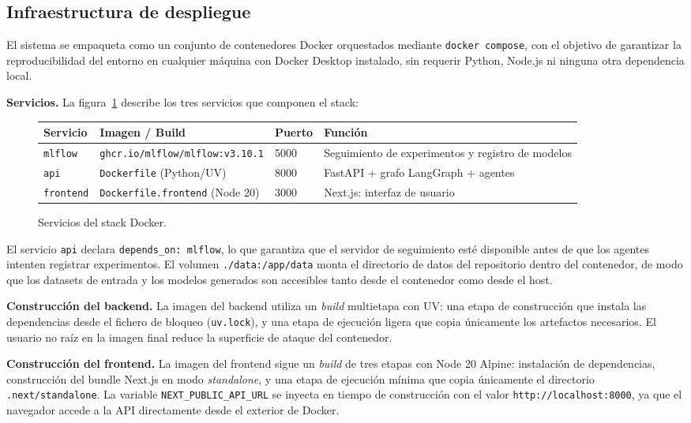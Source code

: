 \subsection{Infraestructura de despliegue}
\label{sec:infraestructura}

El sistema se empaqueta como un conjunto de contenedores Docker orquestados mediante \texttt{docker compose}, con el objetivo de garantizar la reproducibilidad del entorno en cualquier máquina con Docker Desktop instalado, sin requerir Python, Node.js ni ninguna otra dependencia local.

\textbf{Servicios.} La figura~\ref{fig:docker-services} describe los tres servicios que componen el stack:

\begin{figure}[H]
\centering
\begin{tabular}{llll}
\hline
\textbf{Servicio} & \textbf{Imagen / Build} & \textbf{Puerto} & \textbf{Función} \\
\hline
\texttt{mlflow}   & \texttt{ghcr.io/mlflow/mlflow:v3.10.1} & 5000 & Seguimiento de experimentos y registro de modelos \\
\texttt{api}      & \texttt{Dockerfile} (Python/UV)         & 8000 & FastAPI + grafo LangGraph + agentes \\
\texttt{frontend} & \texttt{Dockerfile.frontend} (Node 20)  & 3000 & Next.js: interfaz de usuario \\
\hline
\end{tabular}
\caption{Servicios del stack Docker.}
\label{fig:docker-services}
\end{figure}

El servicio \texttt{api} declara \texttt{depends\_on: mlflow}, lo que garantiza que el servidor de seguimiento esté disponible antes de que los agentes intenten registrar experimentos. El volumen \texttt{./data:/app/data} monta el directorio de datos del repositorio dentro del contenedor, de modo que los datasets de entrada y los modelos generados son accesibles tanto desde el contenedor como desde el host.

\textbf{Construcción del backend.} La imagen del backend utiliza un \emph{build} multietapa con UV: una etapa de construcción que instala las dependencias desde el fichero de bloqueo (\texttt{uv.lock}), y una etapa de ejecución ligera que copia únicamente los artefactos necesarios. El usuario no raíz en la imagen final reduce la superficie de ataque del contenedor.

\textbf{Construcción del frontend.} La imagen del frontend sigue un \emph{build} de tres etapas con Node 20 Alpine: instalación de dependencias, construcción del bundle Next.js en modo \emph{standalone}, y una etapa de ejecución mínima que copia únicamente el directorio \texttt{.next/standalone}. La variable \texttt{NEXT\_PUBLIC\_API\_URL} se inyecta en tiempo de construcción con el valor \texttt{http://localhost:8000}, ya que el navegador accede a la API directamente desde el exterior de Docker.

